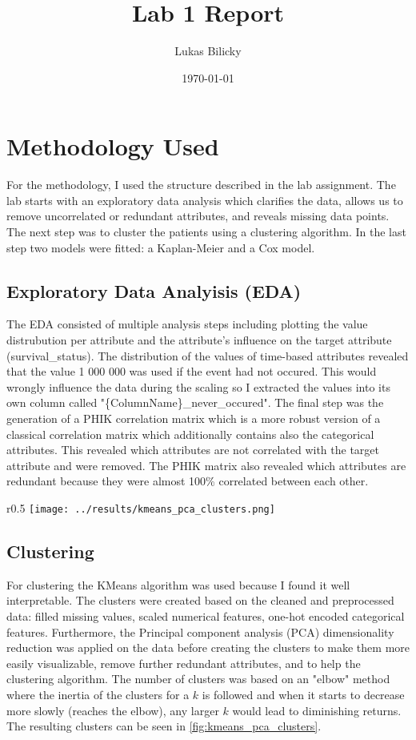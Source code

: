 \documentclass[a4paper,12pt]{article}
\title{Lab 1 Report}
\author{Lukas Bilicky}
\date{\today}
\begin{document}
\maketitle

\section{Methodology Used}
For the methodology, I used the structure described in the lab assignment. The lab starts with an exploratory data analysis which clarifies the data, allows us to remove uncorrelated or redundant attributes, and reveals missing data points. The next step was to cluster the patients using a clustering algorithm. In the last step two models were fitted: a Kaplan-Meier and a Cox model.

\subsection{Exploratory Data Analyisis (EDA)}

The EDA consisted of multiple analysis steps including plotting the value distrubution per attribute and the attribute's influence on the target attribute (survival\_status). The distribution of the values of time-based attributes revealed that the value 1 000 000 was used if the event had not occured. This would wrongly influence the data during the scaling so I extracted the values into its own column called "\{ColumnName\}\_never\_occured". The final step was the generation of a PHIK correlation matrix which is a more robust version of a classical correlation matrix which additionally contains also the categorical attributes. This revealed which attributes are not correlated with the target attribute and were removed. The PHIK matrix also revealed which attributes are redundant because they were almost 100\% correlated between each other.

\begin{wrapfigure}{r}{0.5\linewidth}
  \centering
  \texttt{[image: ../results/kmeans\_pca\_clusters.png]}
  \caption{KMeans Clusters Visualized with PCA}
  \label{fig:kmeans_pca_clusters}
\end{wrapfigure}

\subsection{Clustering}

For clustering the KMeans algorithm was used because I found it well interpretable. The clusters were created based on the cleaned and preprocessed data: filled missing values, scaled numerical features, one-hot encoded categorical features. Furthermore, the Principal component analysis (PCA) dimensionality reduction was applied on the data before creating the clusters to make them more easily visualizable, remove further redundant attributes, and to help the clustering algorithm. The number of clusters was based on an "elbow" method where the inertia of the clusters for a $k$ is followed and when it starts to decrease more slowly (reaches the elbow), any larger $k$ would lead to diminishing returns. The resulting clusters can be seen in \ref{fig:kmeans_pca_clusters}.
\end{document}
